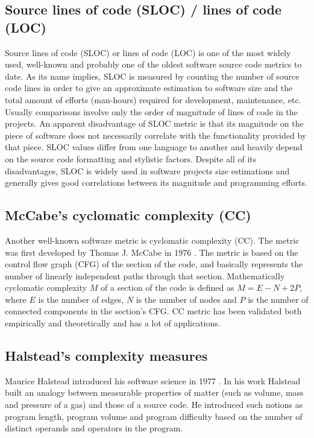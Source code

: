 \subsection{Source lines of code (SLOC) / lines of code (LOC)}
\label{background-source-lines-of-code}
\qquad Source lines of code (SLOC) or lines of code (LOC) is one of the most widely used, well-known and probably one of the oldest software source code metrics to date. As its name implies, SLOC is measured by counting the number of source code lines in order to give an approximate estimation to software size and the total amount of efforts (man-hours) required for development, maintenance, etc. Usually comparisons involve only the order of magnitude of lines of code in the projects. An apparent disadvantage of SLOC metric is that its magnitude on the piece of software does not necessarily correlate with the functionality provided by that piece. SLOC values differ from one language to another and heavily depend on the source code formatting and stylistic factors. Despite all of its disadvantages, SLOC is widely used in software projects size estimations and generally gives good correlations between its magnitude and programming efforts.

\subsection{McCabe's cyclomatic complexity (CC)}
\label{background-cyclomatic-complexity}
\qquad Another well-known software metric is cyclomatic complexity (CC). The metric was first developed by Thomas J. McCabe in 1976 \cite{cyclomatic-complexity-paper}. The metric is based on the control flow graph (CFG) of the section of the code, and basically represents the number of linearly independent paths through that section. Mathematically cyclomatic complexity $M$ of a section of the code is defined as $M = E - N + 2P$, where $E$ is the number of edges, $N$ is the number of nodes and $P$ is the number of connected components in the section's CFG. CC metric has been validated both empirically and theoretically and has a lot of applications.

\subsection{Halstead's complexity measures}
\label{background-halsteads-measures}
\qquad Maurice Halstead introduced his software science in 1977 \cite{halstead-book}. In his work Halstead built an analogy between measurable properties of matter (such as volume, mass and pressure of a gas) and those of a source code. He introduced such notions as program length, program volume and program difficulty based on the number of distinct operands and operators in the program.

